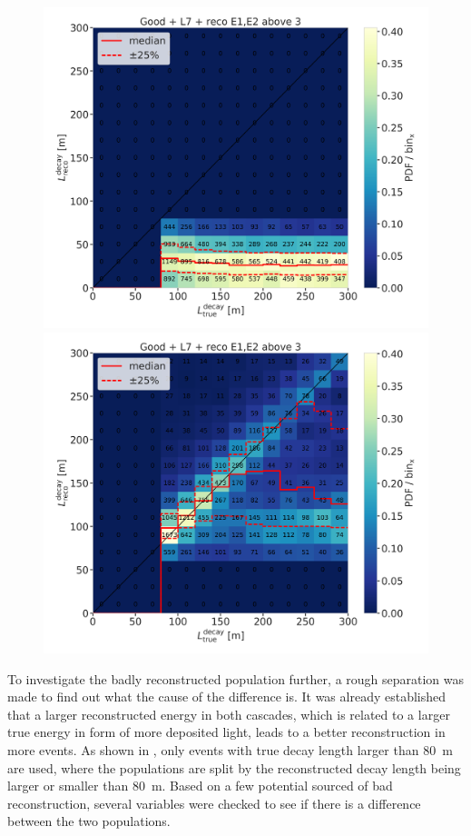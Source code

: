 \begin{figure}[h]
    \centering
    \includegraphics[width=0.49\linewidth]{figures/results/190607/second_population/190607_millipede_level_no_NaNs_NEW_flipped_reco_decayL_vs_true_decayL_reco_above3_population_in_step_contours.png}
    \includegraphics[width=0.49\linewidth]{figures/results/190607/second_population/190607_millipede_level_no_NaNs_NEW_flipped_reco_decayL_vs_true_decayL_reco_above3_population_out_step_contours.png}
    \caption[]{}
\end{figure}

To investigate the badly reconstructed population further, a rough separation was made to find out what the cause of the difference is. It was already established that a larger reconstructed energy in both cascades, which is related to a larger true energy in form of more deposited light, leads to a better reconstruction in more events. As shown in , only events with true decay length larger than \SI{80}{\meter} are used, where the populations are split by the reconstructed decay length being larger or smaller than \SI{80}{\meter}. Based on a few potential sourced of bad reconstruction, several variables were checked to see if there is a difference between the two populations.

